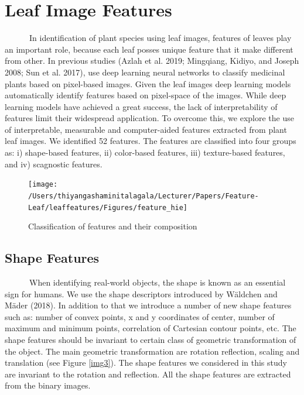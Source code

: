\documentclass{article}
\begin{document}
\hypertarget{leaf-image-features}{%
\section{Leaf Image Features}\label{leaf-image-features}}

~~~~~~In identification of plant species using leaf images, features of
leaves play an important role, because each leaf posses unique feature
that it make different from other. In previous studies (Azlah et al.
2019; Mingqiang, Kidiyo, and Joseph 2008; Sun et al. 2017), use deep
learning neural networks to classify medicinal plants based on
pixel-based images. Given the leaf images deep learning models
automatically identify features based on pixel-space of the images.
While deep learning models have achieved a great success, the lack of
interpretability of features limit their widespread application. To
overcome this, we explore the use of interpretable, measurable and
computer-aided features extracted from plant leaf images. We identified
52 features. The features are classified into four groups as: i)
shape-based features, ii) color-based features, iii) texture-based
features, and iv) scagnostic features.

\begin{figure}[!ht]

{\centering \texttt{[image: /Users/thiyangashaminitalagala/Lecturer/Papers/Feature-Leaf/leaffeatures/Figures/feature\_hie]} 

}

\caption{\label{img33}Classification of features and their composition}\label{fig:unnamed-chunk-10}
\end{figure}

\hypertarget{shape-features}{%
\subsection{Shape Features}\label{shape-features}}

~~~~~~When identifying real-world objects, the shape is known as an
essential sign for humans. We use the shape descriptors introduced by
Wäldchen and Mäder (2018). In addition to that we introduce a number of
new shape features such as: number of convex points, x and y coordinates
of center, number of maximum and minimum points, correlation of
Cartesian contour points, etc. The shape features should be invariant to
certain class of geometric transformation of the object. The main
geometric transformation are rotation reflection, scaling and
translation (see Figure \ref{img3}). The shape features we considered in
this study are invariant to the rotation and reflection. All the shape
features are extracted from the binary images.
\end{document}
